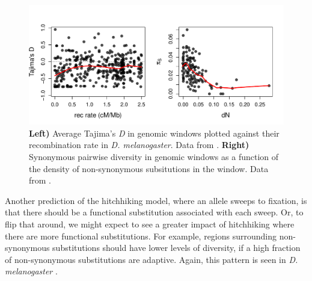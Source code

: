 \begin{figure}
\begin{center}
\includegraphics[width=\textwidth]{Journal_figs/recom_selection/Andolfatto_subs_vs_dN/Tajimas_D_subs_vs_dN.pdf}
\end{center}
\caption{{\bf Left)} Average Tajima's {\it D} in genomic windows plotted
  against their recombination rate in \textit{D. melanogaster}. Data
  from \citet{Shapiro:07}. {\bf Right)} Synonymous pairwise diversity
  in genomic windows  as a function of the density of non-synonymous
  subsitutions in the window. Data from \citet{Andolfatto:07}. } \label{fig:Tajimas_D_dN_pi}
\end{figure}

Another prediction of the hitchhiking model, where an allele sweeps to
fixation, is that there should be a functional substitution associated with each
sweep. Or, to flip that around, we might expect to see a greater impact
of hitchhiking where there are more functional substitutions. 
For example, regions surrounding non-synonymous substitutions should have lower levels of
diversity, if a high fraction of non-synonymous substitutions are adaptive. Again, this pattern is seen in \textit{D. melanogaster}
\citep[][, right side of
Figure \ref{fig:Tajimas_D_dN_pi}]{Andolfatto:07, Macpherson:07,Sattath:11}.

